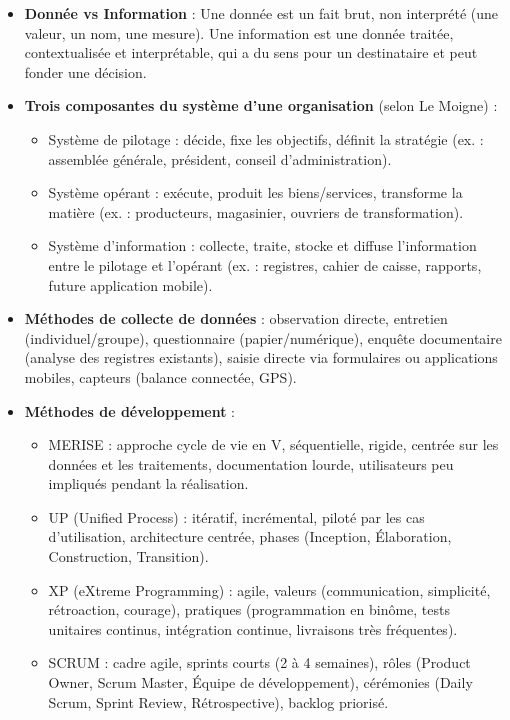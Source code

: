 \documentclass[11pt]{article}
\newcommand{\cle}[1]{{\popxbold\color{popdark}#1}}
\begin{document}
\begin{aretenir}
\begin{itemize}
\item \textbf{Donnée vs Information} : Une \cle{donnée} est un fait brut, non interprété (une valeur, un nom, une mesure). Une \cle{information} est une donnée traitée, contextualisée et interprétable, qui a du sens pour un destinataire et peut fonder une décision.
\item \textbf{Trois composantes du système d'une organisation} (selon Le Moigne) :
      \begin{itemize}
      \item \cle{Système de pilotage} : décide, fixe les objectifs, définit la stratégie (ex. : assemblée générale, président, conseil d'administration).
      \item \cle{Système opérant} : exécute, produit les biens/services, transforme la matière (ex. : producteurs, magasinier, ouvriers de transformation).
      \item \cle{Système d'information} : collecte, traite, stocke et diffuse l'information entre le pilotage et l'opérant (ex. : registres, cahier de caisse, rapports, future application mobile).
      \end{itemize}
\item \textbf{Méthodes de collecte de données} : observation directe, entretien (individuel/groupe), questionnaire (papier/numérique), enquête documentaire (analyse des registres existants), saisie directe via formulaires ou applications mobiles, capteurs (balance connectée, GPS).
\item \textbf{Méthodes de développement} :
      \begin{itemize}
      \item \cle{MERISE} : approche cycle de vie en V, séquentielle, rigide, centrée sur les données et les traitements, documentation lourde, utilisateurs peu impliqués pendant la réalisation.
      \item \cle{UP (Unified Process)} : itératif, incrémental, piloté par les cas d'utilisation, architecture centrée, phases (Inception, Élaboration, Construction, Transition).
      \item \cle{XP (eXtreme Programming)} : agile, valeurs (communication, simplicité, rétroaction, courage), pratiques (programmation en binôme, tests unitaires continus, intégration continue, livraisons très fréquentes).
      \item \cle{SCRUM} : cadre agile, sprints courts (2 à 4 semaines), rôles (Product Owner, Scrum Master, Équipe de développement), cérémonies (Daily Scrum, Sprint Review, Rétrospective), backlog priorisé.

\end{itemize}
\end{itemize}
\end{aretenir}
\end{document}
